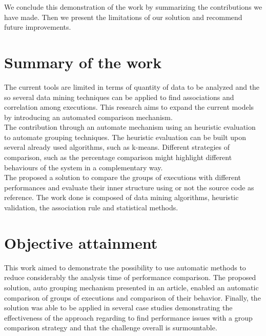 \label{sec:Conclusion}
We conclude this demonstration of the work by summarizing the contributions we have made. Then we present the limitations of our solution and recommend future improvements.

\section{Summary of the work}
The current tools are limited in terms of quantity of data to be analyzed and the so several data mining techniques can be applied to find associations and correlation among executions. This research aims to expand the current models by introducing an automated comparison mechanism. \\
The contribution through an automate mechanism using an heuristic evaluation to automate grouping techniques. The heuristic evaluation can be built upon several already used algorithms, such as k-means. Different strategies of comparison, such as the percentage comparison might highlight different behaviours of the system in a complementary way.\\
The proposed a solution to compare the groups of executions with different performances and evaluate their inner structure using or not the source code as reference. The work done is composed of data mining algorithms,  heuristic validation, the association rule and statistical methods.


\section{Objective attainment}\label{sec:Limitations}
This work aimed to demonstrate the possibility to use automatic methods to reduce considerably the analysis time of performance comparison. The proposed solution, auto grouping mechanism presented in an article, enabled an automatic comparison of groups of executions and comparison of their behavior. Finally, the solution was able to be applied in several case studies demonstrating the effectiveness of the approach regarding to find performance issues with a group comparison strategy and that the challenge overall is surmountable.\\
